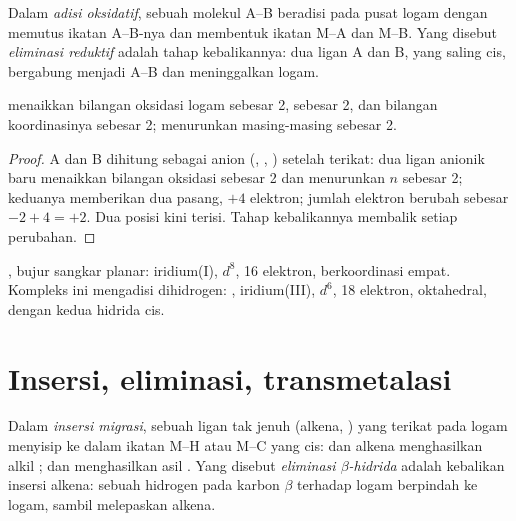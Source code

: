 \begin{definition}\label{def:b2:catalytic-cycles:oxidative-addition}
Dalam \emph{adisi oksidatif}, sebuah molekul A--B
beradisi pada pusat logam dengan memutus ikatan A--B-nya dan membentuk
ikatan M--A dan M--B. Yang disebut
\emph{eliminasi reduktif} adalah tahap
kebalikannya: dua ligan A dan B, yang saling cis, bergabung menjadi A--B dan
meninggalkan logam.
\end{definition}

\begin{proposition}\label{prop:b2:catalytic-cycles:oa}
 menaikkan bilangan oksidasi logam sebesar 2,  sebesar 2, dan bilangan koordinasinya sebesar 2;  menurunkan masing-masing sebesar 2.
\end{proposition}

\begin{proof}
A dan B dihitung sebagai anion (, , ) setelah terikat:
dua ligan anionik baru menaikkan bilangan oksidasi sebesar 2 dan menurunkan
$n$ sebesar 2; keduanya memberikan dua pasang, $+4$
elektron; jumlah elektron berubah sebesar $-2 + 4 = +2$. Dua posisi kini
terisi. Tahap kebalikannya membalik setiap perubahan.
\end{proof}

\begin{example}\label{ex:b2:catalytic-cycles:vaska}
, bujur sangkar planar: iridium(I), $d^8$, 16 elektron,
berkoordinasi empat. Kompleks ini mengadisi dihidrogen:
, iridium(III), $d^6$, 18 elektron, oktahedral,
dengan kedua hidrida cis.
\end{example}

\section{Insersi, eliminasi, transmetalasi}

\begin{definition}\label{def:b2:catalytic-cycles:insertion}
Dalam \emph{insersi migrasi}, sebuah ligan tak jenuh
(alkena, ) yang terikat pada logam menyisip ke dalam ikatan M--H atau
M--C yang cis:  dan alkena menghasilkan alkil ;
 dan  menghasilkan asil .
Yang disebut \emph{eliminasi $\beta$-hidrida}
adalah kebalikan insersi alkena: sebuah hidrogen pada karbon $\beta$ terhadap
logam berpindah ke logam, sambil melepaskan alkena.
\end{definition}

